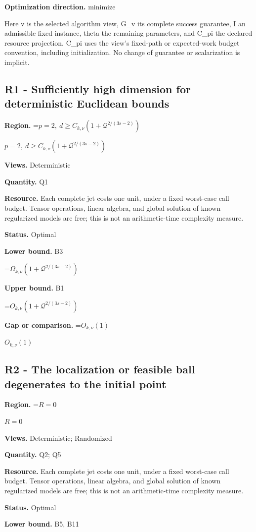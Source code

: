 \documentclass[10pt,a4paper]{article}
\newcommand{\AtlasMath}[1]{\par\begingroup\centering\setbox0=\hbox{$\displaystyle #1$}\ifdim\wd0>1.4\linewidth\typeout{ATLAS WIDE FORMULA: \the\wd0}\fi\ifdim\wd0>\linewidth\resizebox{\linewidth}{!}{\box0}\else\box0\fi\par\endgroup}
\newcommand{\AtlasInlineMath}[1]{\begingroup\setbox0=\hbox{$#1$}\ifdim\wd0>.4\linewidth\endgroup\AtlasMath{#1}\else\endgroup$#1$\fi}
\begin{document}
\textbf{Optimization direction.} minimize

Here v is the selected algorithm view, G\_\allowbreak{}v its complete success guarantee, I an admissible fixed instance, theta the remaining parameters, and C\_\allowbreak{}pi the declared resource projection. C\_\allowbreak{}pi uses the view's fixed-path or expected-work budget convention, including initialization. No change of guarantee or scalarization is implicit.

\subsection{R1 - Sufficiently high dimension for deterministic Euclidean bounds}
\textbf{Region.} \AtlasInlineMath{p=2,\ d\ge C_{k,\nu}(1+\mathcal{Q}^{2/(3s-2)})}

\textbf{Views.} Deterministic

\textbf{Quantity.} Q1

\textbf{Resource.} Each complete jet costs one unit, under a fixed worst-case call budget. Tensor operations, linear algebra, and global solution of known regularized models are free; this is not an arithmetic-time complexity measure.

\textbf{Status.} Optimal

\textbf{Lower bound.} B3

\AtlasMath{\Omega_{k,\nu}(1+\mathcal{Q}^{2/(3s-2)})}
\textbf{Upper bound.} B1

\AtlasMath{O_{k,\nu}(1+\mathcal{Q}^{2/(3s-2)})}
\textbf{Gap or comparison.} \AtlasInlineMath{O_{k,\nu}(1)}

\subsection{R2 - The localization or feasible ball degenerates to the initial point}
\textbf{Region.} \AtlasInlineMath{R=0}

\textbf{Views.} Deterministic; Randomized

\textbf{Quantity.} Q2; Q5

\textbf{Resource.} Each complete jet costs one unit, under a fixed worst-case call budget. Tensor operations, linear algebra, and global solution of known regularized models are free; this is not an arithmetic-time complexity measure.

\textbf{Status.} Optimal

\textbf{Lower bound.} B5, B11
\end{document}
